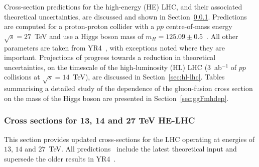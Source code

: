 %
%
%
Cross-section predictions for the high-energy (HE) LHC, and their associated theoretical uncertainties, are discussed and shown in
Section~\ref{sec:he-lhc}. Predictions are computed for a proton-proton collider with a $pp$ centre-of-mass
energy $\sqrt{s}=27$~TeV and use a Higgs
boson mass of $m_H=125.09 \pm 0.5$~\UGeV.   All other parameters are taken from YR4~\cite{deFlorian:2016spz},
with exceptions noted where they are important.  
Projections of progress towards a reduction in theoretical uncertainties, on the timescale
of the high-luminosity (HL) LHC (3~ab$^{-1}$ of $pp$ collisions at $\sqrt{s}=14$~TeV), are discussed in Section~\ref{sec:hl-lhc}. 
Tables summarising a detailed study of the dependence of the gluon-fusion cross section on the mass of the Higgs boson
are presented in Section~\ref{sec:ggFmhdep}.

\subsubsection{Cross sections for 13, 14 and 27 TeV HE-LHC}
\label{sec:he-lhc}

This section provides updated cross-sections for the LHC operating at
energies of $13$, $14$ and $27$~TeV. All predictions~\cite{HXSWGwiki} include the latest 
theoretical input and supersede the older results in YR4~\cite{deFlorian:2016spz}.

